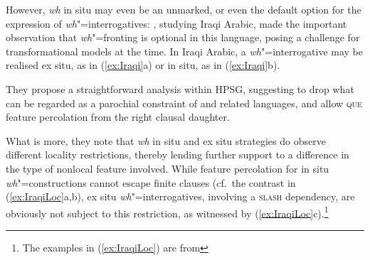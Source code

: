 \documentclass[output=paper
,notxmath 
 	        ,biblatex
                ,babelshorthands
                ,newtxmath
                ,draftmode
                ,colorlinks, citecolor=brown
]{langscibook}
\begin{document}
However, \emph{wh} in situ may even be an unmarked, or even the default
option for the expression of \emph{wh}"=interrogatives:
\citet[Section~6.2]{Johnson:Lappin:97}, studying Iraqi Arabic, made the important
observation that \emph{wh}"=fronting is optional in this language,
posing a challenge for transformational models at the time.  In Iraqi
Arabic, a \emph{wh}"=interrogative may be realised ex situ, as in
(\ref{ex:Iraqi}a) or in situ, as in (\ref{ex:Iraqi}b).

\eal
\label{ex:Iraqi}
\zl

\noindent
They propose a straightforward analysis within HPSG, suggesting to
drop what can be regarded as a parochial constraint of  and
related languages, and allow \textsc{que} feature percolation from the
right clausal daughter.
 
What is more, they note that \emph{wh} in situ and ex situ strategies
do observe different locality restrictions, thereby lending further
support to a difference in the type of nonlocal feature
involved. While feature percolation for in situ
\emph{wh}"=constructions cannot escape finite clauses (cf.\ the
contrast in (\ref{ex:IraqiLoc}a,b), ex situ \emph{wh}"=interrogatives,
involving a \textsc{slash} dependency, are obviously not subject to
this restriction, as witnessed by (\ref{ex:IraqiLoc}c).\footnote{The examples in (\ref{ex:IraqiLoc}) are from }


    
\eal \label{ex:IraqiLoc}
\zl
\end{document}
